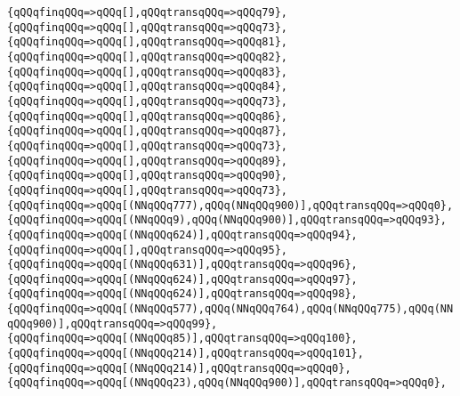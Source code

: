 \verb|{qQQqfinqQQq=>qQQq[],qQQqtransqQQq=>qQQq79},|\newline
\verb|{qQQqfinqQQq=>qQQq[],qQQqtransqQQq=>qQQq73},|\newline
\verb|{qQQqfinqQQq=>qQQq[],qQQqtransqQQq=>qQQq81},|\newline
\verb|{qQQqfinqQQq=>qQQq[],qQQqtransqQQq=>qQQq82},|\newline
\verb|{qQQqfinqQQq=>qQQq[],qQQqtransqQQq=>qQQq83},|\newline
\verb|{qQQqfinqQQq=>qQQq[],qQQqtransqQQq=>qQQq84},|\newline
\verb|{qQQqfinqQQq=>qQQq[],qQQqtransqQQq=>qQQq73},|\newline
\verb|{qQQqfinqQQq=>qQQq[],qQQqtransqQQq=>qQQq86},|\newline
\verb|{qQQqfinqQQq=>qQQq[],qQQqtransqQQq=>qQQq87},|\newline
\verb|{qQQqfinqQQq=>qQQq[],qQQqtransqQQq=>qQQq73},|\newline
\verb|{qQQqfinqQQq=>qQQq[],qQQqtransqQQq=>qQQq89},|\newline
\verb|{qQQqfinqQQq=>qQQq[],qQQqtransqQQq=>qQQq90},|\newline
\verb|{qQQqfinqQQq=>qQQq[],qQQqtransqQQq=>qQQq73},|\newline
\verb|{qQQqfinqQQq=>qQQq[(NNqQQq777),qQQq(NNqQQq900)],qQQqtransqQQq=>qQQq0},|\newline
\verb|{qQQqfinqQQq=>qQQq[(NNqQQq9),qQQq(NNqQQq900)],qQQqtransqQQq=>qQQq93},|\newline
\verb|{qQQqfinqQQq=>qQQq[(NNqQQq624)],qQQqtransqQQq=>qQQq94},|\newline
\verb|{qQQqfinqQQq=>qQQq[],qQQqtransqQQq=>qQQq95},|\newline
\verb|{qQQqfinqQQq=>qQQq[(NNqQQq631)],qQQqtransqQQq=>qQQq96},|\newline
\verb|{qQQqfinqQQq=>qQQq[(NNqQQq624)],qQQqtransqQQq=>qQQq97},|\newline
\verb|{qQQqfinqQQq=>qQQq[(NNqQQq624)],qQQqtransqQQq=>qQQq98},|\newline
\verb|{qQQqfinqQQq=>qQQq[(NNqQQq577),qQQq(NNqQQq764),qQQq(NNqQQq775),qQQq(NNqQQq900)],qQQqtransqQQq=>qQQq99},|\newline
\verb|{qQQqfinqQQq=>qQQq[(NNqQQq85)],qQQqtransqQQq=>qQQq100},|\newline
\verb|{qQQqfinqQQq=>qQQq[(NNqQQq214)],qQQqtransqQQq=>qQQq101},|\newline
\verb|{qQQqfinqQQq=>qQQq[(NNqQQq214)],qQQqtransqQQq=>qQQq0},|\newline
\verb|{qQQqfinqQQq=>qQQq[(NNqQQq23),qQQq(NNqQQq900)],qQQqtransqQQq=>qQQq0},|\newline
